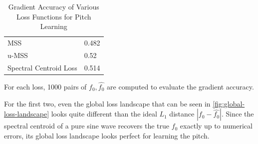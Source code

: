 \begin{theappendices}
\begin{table}
    \centering
    \begin{tabular}{ll}
        MSS & 0.482 \\
        u-MSS & 0.52 \\
        Spectral Centroid Loss & 0.514 \\
    \end{tabular}
    \caption{Gradient Accuracy of Various Loss Functions for Pitch Learning}
    \label{tab:gradient-accuracy}
    \small{For each loss, 1000 pairs of $f_0, \hat{f_0}$ are computed to evaluate the gradient accuracy.}
\end{table}

For the first two, even the global loss landscape that can be seen in \ref{fig:global-loss-landscape} looks quite different than the ideal $L_1$ distance $|f_0 - \hat{f_0}|$.
Since the spectral centroid of a pure sine wave recovers the true $f_0$ exactly up to numerical errors, its global loss landscape looks perfect for learning the pitch.


\end{theappendices}
